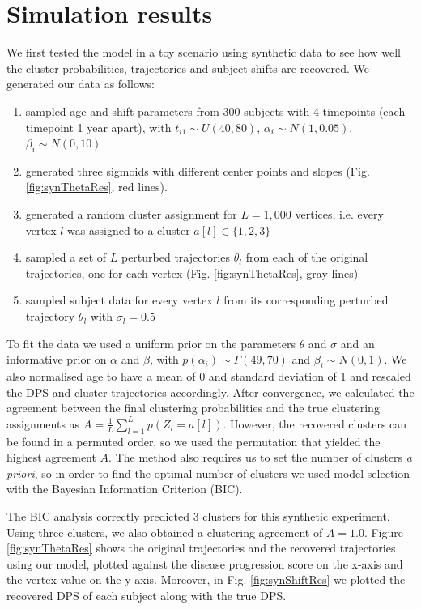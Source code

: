 \section{Simulation results}
\label{sec:vwdpm_simulations}

We first tested the model in a toy scenario using synthetic data to see how well the cluster probabilities, trajectories and subject shifts are recovered. We generated our data as follows:
\begin{enumerate}
 \item sampled age and shift parameters from 300 subjects with 4 timepoints (each timepoint 1 year apart), with $t_{i1} \sim U(40,80)$, $\alpha_i \sim N(1, 0.05)$, $\beta_i \sim N(0, 10)$
 \item generated three sigmoids with different center points and slopes (Fig. \ref{fig:synThetaRes}, red lines). 
 \item generated a random cluster assignment for $L = 1,000$ vertices, i.e. every vertex $l$ was assigned to a cluster $a[l] \in \{1,2,3\}$
 \item sampled a set of $L$ perturbed trajectories $\theta_l$ from each of the original trajectories, one for each vertex (Fig. \ref{fig:synThetaRes}, gray lines)
 \item sampled subject data for every vertex $l$ from its corresponding perturbed trajectory $\theta_l$ with $\sigma_l = 0.5$
\end{enumerate}
To fit the data we used a uniform prior on the parameters $\theta$ and $\sigma$ and an informative prior on $\alpha$ and $\beta$, with $p(\alpha_i) \sim \Gamma(49,70)$ and $\beta_i \sim N(0,1)$. We also normalised age to have a mean of 0 and standard deviation of 1 and rescaled the DPS and cluster trajectories accordingly. After convergence, we calculated the agreement between the final clustering probabilities and the true clustering assignments as $A = \frac{1}{L}\sum_{l=1}^L p(Z_l = a[l])$. However, the recovered clusters can be found in a permuted order, so we used the permutation that yielded the highest agreement $A$. The method also requires us to set the number of clusters \emph{a priori}, so in order to find the optimal number of clusters we used model selection with the Bayesian Information Criterion (BIC). 

The BIC analysis correctly predicted 3 clusters for this synthetic experiment. Using three clusters, we also obtained a clustering agreement of $A = 1.0$. Figure \ref{fig:synThetaRes} shows the original trajectories and the recovered trajectories using our model, plotted against the disease progression score on the x-axis and the vertex value on the y-axis. Moreover, in Fig. \ref{fig:synShiftRes} we plotted the recovered DPS of each subject along with the true DPS. 


